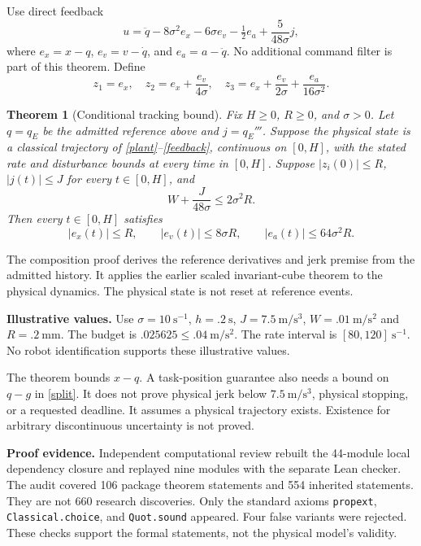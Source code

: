 \documentclass[11pt,letterpaper]{article}
\newtheorem{theorem}{Theorem}
\begin{document}
Use direct feedback
\begin{equation}\label{feedback}
u=\ddot q-8\sigma^2e_x-6\sigma e_v-\tfrac12e_a+\frac{5}{48\sigma}j,
\end{equation}
where $e_x=x-q$, $e_v=v-\dot q$, and $e_a=a-\ddot q$. No additional command filter is part of this theorem. Define
\[
z_1=e_x,\quad z_2=e_x+\frac{e_v}{4\sigma},\quad
z_3=e_x+\frac{e_v}{2\sigma}+\frac{e_a}{16\sigma^2}.
\]
\begin{theorem}[Conditional tracking bound]\label{tracking}
Fix $H\geq0$, $R\geq0$, and $\sigma>0$. Let $q=q_E$ be the admitted reference above and $j=q_E'''$. Suppose the physical state is a classical trajectory of \eqref{plant}--\eqref{feedback}, continuous on $[0,H]$, with the stated rate and disturbance bounds at every time in $[0,H]$. Suppose $|z_i(0)|\leq R$, $|j(t)|\leq J$ for every $t\in[0,H]$, and
\begin{equation}\label{budget}
W+\frac{J}{48\sigma}\leq2\sigma^2R.
\end{equation}
Then every $t\in[0,H]$ satisfies
\[
|e_x(t)|\leq R,\qquad |e_v(t)|\leq8\sigma R,\qquad
|e_a(t)|\leq64\sigma^2R.
\]
\end{theorem}
The composition proof derives the reference derivatives and jerk premise from the admitted history. It applies the earlier scaled invariant-cube theorem to the physical dynamics. The physical state is not reset at reference events.

\textbf{Illustrative values.} Use $\sigma=10\ \mathrm{s}^{-1}$, $h=.2\ \mathrm{s}$, $J=7.5\ \mathrm{m/s^3}$, $W=.01\ \mathrm{m/s^2}$ and $R=.2\ \mathrm{mm}$. The budget is $.025625\leq.04\ \mathrm{m/s^2}$. The rate interval is $[80,120]\ \mathrm{s}^{-1}$. No robot identification supports these illustrative values.

The theorem bounds $x-q$. A task-position guarantee also needs a bound on $q-g$ in \eqref{split}. It does not prove physical jerk below $7.5\ \mathrm{m/s^3}$, physical stopping, or a requested deadline. It assumes a physical trajectory exists. Existence for arbitrary discontinuous uncertainty is not proved.

\textbf{Proof evidence.} Independent computational review rebuilt the 44-module local dependency closure and replayed nine modules with the separate Lean checker. The audit covered 106 package theorem statements and 554 inherited statements. They are not 660 research discoveries. Only the standard axioms \texttt{propext}, \texttt{Classical.choice}, and \texttt{Quot.sound} appeared. Four false variants were rejected. These checks support the formal statements, not the physical model's validity.
\end{document}
